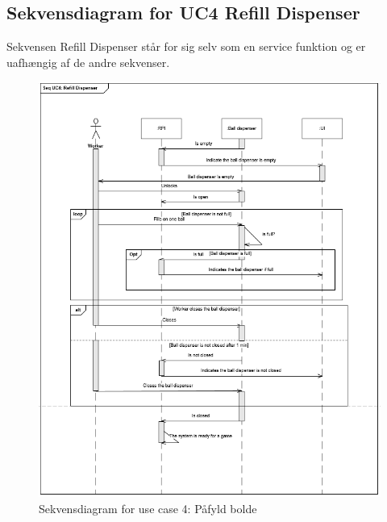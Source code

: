 \documentclass[Arkitektur/System_main.tex]{subfiles}
\begin{document}
\subsection{Sekvensdiagram for UC4 Refill Dispenser}
Sekvensen Refill Dispenser står for sig selv som en service funktion og er uafhængig af de andre sekvenser. 
\begin{figure}[H]
    \centering
    \includegraphics[scale=0.9]{Arkitektur/Sekvensdiagrammer/graphics/sd_UC2.png}
    \caption{Sekvensdiagram for use case 4: Påfyld bolde}
    \label{fig:Seq_UC4}
\end{figure}
\end{document}
